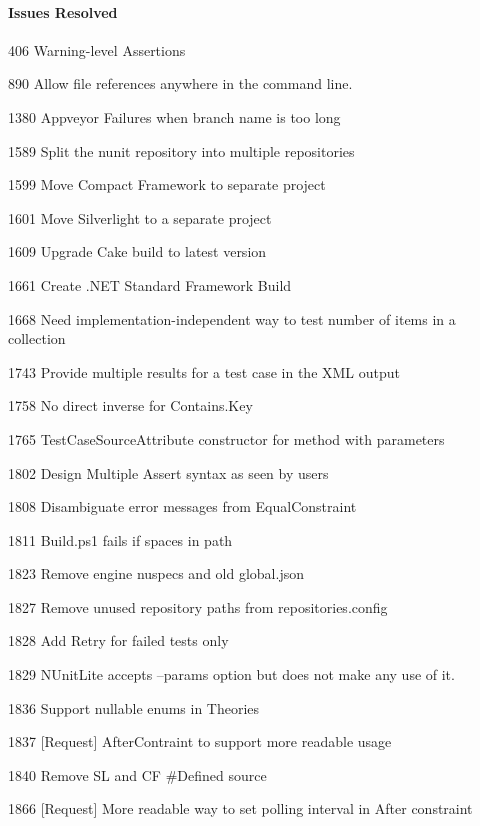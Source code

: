 \paragraph*{Issues Resolved}


\begin{DoxyItemize}
\item 406 Warning-\/level Assertions
\item 890 Allow file references anywhere in the command line.
\item 1380 Appveyor Failures when branch name is too long
\item 1589 Split the nunit repository into multiple repositories
\item 1599 Move Compact Framework to separate project
\item 1601 Move Silverlight to a separate project
\item 1609 Upgrade Cake build to latest version
\item 1661 Create .N\+ET Standard Framework Build
\item 1668 Need implementation-\/independent way to test number of items in a collection
\item 1743 Provide multiple results for a test case in the X\+ML output
\item 1758 No direct inverse for Contains.\+Key
\item 1765 Test\+Case\+Source\+Attribute constructor for method with parameters
\item 1802 Design Multiple Assert syntax as seen by users
\item 1808 Disambiguate error messages from Equal\+Constraint
\item 1811 Build.\+ps1 fails if spaces in path
\item 1823 Remove engine nuspecs and old global.\+json
\item 1827 Remove unused repository paths from repositories.\+config
\item 1828 Add Retry for failed tests only
\item 1829 N\+Unit\+Lite accepts --params option but does not make any use of it.
\item 1836 Support nullable enums in Theories
\item 1837 \mbox{[}Request\mbox{]} After\+Contraint to support more readable usage
\item 1840 Remove SL and CF \#\+Defined source
\item 1866 \mbox{[}Request\mbox{]} More readable way to set polling interval in After constraint

\end{DoxyItemize}
